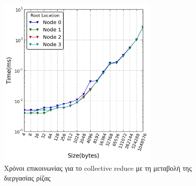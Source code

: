 \begin{figure}[ht]
    \centering
     \captionsetup{justification=centering,margin=0cm,font=footnotesize}
    \includegraphics[width=0.7\textwidth]{./images/root.png}
    \caption{Χρόνοι επικοινωνίας για το collective reduce με τη μεταβολή της διεργασίας ρίζας}
    \label{fig:root}
\end{figure}

